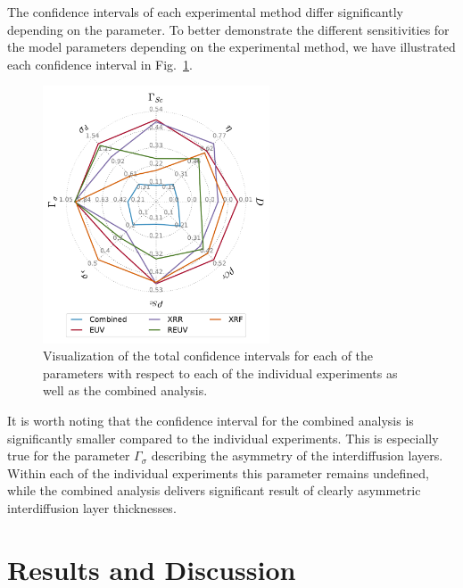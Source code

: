 The confidence intervals of each experimental method differ significantly depending on the parameter. To better demonstrate the different sensitivities for the model parameters depending on the experimental method, we have illustrated each confidence interval in Fig.~\ref{fig:confidence_intervals}.
\begin{figure}
  \centering
  \includegraphics[width=0.6\textwidth]{img/im_cr_sc_multilayer/spiderplot_confidence_intervals_empty}
  \caption{Visualization of the total confidence intervals for each of the parameters with respect to each of the individual experiments as well as the combined analysis.}
  \label{fig:confidence_intervals}
\end{figure}
It is worth noting that the confidence interval for the combined analysis is significantly smaller compared to the individual experiments. This is especially true for the parameter $\Gamma_\sigma$ describing the asymmetry of the interdiffusion layers. Within each of the individual experiments this parameter remains undefined, while the combined analysis delivers significant result of clearly asymmetric interdiffusion layer thicknesses.


\section{Results and Discussion}

